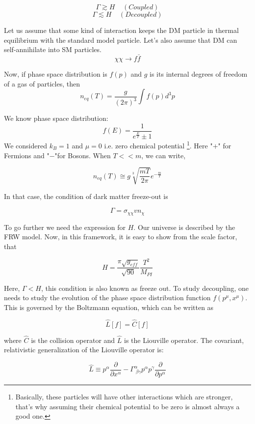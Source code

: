 \documentclass[12pt]{report}
\begin{document}
$$\Gamma \gtrsim H \;\;\; \;(Coupled) \label{coupled} $$ 
$$\Gamma \lesssim H \;\;\;\; (Decoupled)  \label{decoupled}$$	
	
	
	
	Let us assume that some kind of interaction keeps the DM particle in thermal equilibrium with the standard model particle. Let's also assume that DM can self-annihilate into SM particles. $$\chi\chi \rightarrow f\bar{f}$$ 

Now, if phase space distribution is $f(p)$ and $g$ is its internal degrees of freedom of a gas of particles, then $$n_{eq}(T)=\frac{g}{(2 \pi)^3} \int f(p)d^3p $$
	
	
	
We know phase space distribution: $$f(E)=\frac{1}{e^{\frac{E}{T}}\pm1}$$
  We considered $k_B=1$ and $\mu=0$ i.e. zero chemical potential \footnote{ Basically, these particles will have other interactions which are stronger, that's why assuming their chemical potential to be zero is almost always a good one.}. Here "$+$" for Fermions and "$-$"for Bosons.
  When $T<<m$, we can write,

  $$n_{eq}(T) \cong g\sqrt[3]{\frac{mT}{2 \pi}}e^{-\frac{m}{T}}$$

  In that case, the condition of dark matter freeze-out is 

  $$\Gamma=\sigma_{\chi \chi}v n_\chi$$

 
  To go further we need the expression for $H$. Our universe is described by the FRW model. Now, in this framework, it is easy to show from the scale factor, that 

  $$H=\frac{\pi\sqrt{g_{eff}}}{\sqrt{90}}\frac{T^2}{M_{PI}}$$ 

 
	
	
	
	
	
	
	
	

Here, $\Gamma < H$, this condition is also known as freeze out. To study decoupling, one needs to study the evolution of the phase space distribution function $f(p^\mu, x^\mu)$. This is governed by the Boltzmann equation, which can be written as 

$$\hat{L}[f]=\hat{C}[f]$$

where $\hat{C}$ is the collision operator and $\hat{L}$ is the Liouville operator. The covariant, relativistic generalization of the Liouville operator is:

\begin{equation}
\hat{L} \equiv p^\alpha \frac{\partial}{\partial x^\alpha}-\Gamma^\alpha_{\; \beta \gamma} p^\alpha p^\gamma \frac{\partial}{\partial p^\alpha}
\end{equation}
\end{document}
